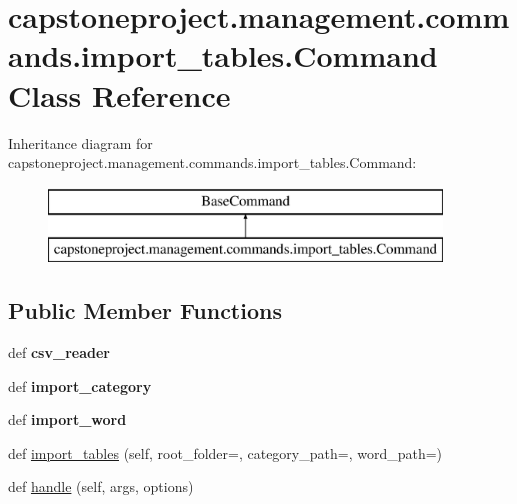 \hypertarget{classcapstoneproject_1_1management_1_1commands_1_1import__tables_1_1_command}{}\section{capstoneproject.\+management.\+commands.\+import\+\_\+tables.\+Command Class Reference}
\label{classcapstoneproject_1_1management_1_1commands_1_1import__tables_1_1_command}
Inheritance diagram for capstoneproject.\+management.\+commands.\+import\+\_\+tables.\+Command\+:\begin{figure}[H]
\begin{center}
\leavevmode
\includegraphics[height=2.000000cm]{classcapstoneproject_1_1management_1_1commands_1_1import__tables_1_1_command}
\end{center}
\end{figure}
\subsection*{Public Member Functions}
\begin{DoxyCompactItemize}
\item 
\mbox{\label{classcapstoneproject_1_1management_1_1commands_1_1import__tables_1_1_command_a4656a82a4bacd81dcd535a2ba6c652fa}} 
def {\bfseries csv\+\_\+reader}
\item 
\mbox{\label{classcapstoneproject_1_1management_1_1commands_1_1import__tables_1_1_command_a24bcc70d03aa9a37bf7f24edc70f851e}} 
def {\bfseries import\+\_\+category}
\item 
\mbox{\label{classcapstoneproject_1_1management_1_1commands_1_1import__tables_1_1_command_a4c3c255dea0b11e58d1e595cddcf0576}} 
def {\bfseries import\+\_\+word}
\item 
def \mbox{\hyperlink{classcapstoneproject_1_1management_1_1commands_1_1import__tables_1_1_command_a0dcd206805dbb47f91221c22dd2f2db0}{import\+\_\+tables}} (self, root\+\_\+folder=\textquotesingle{}\textquotesingle{}, category\+\_\+path=\textquotesingle{}\textquotesingle{}, word\+\_\+path=\textquotesingle{}\textquotesingle{})
\item 
def \mbox{\hyperlink{classcapstoneproject_1_1management_1_1commands_1_1import__tables_1_1_command_a0ab9db6ed07e47f4ff5e6a5beb51674c}{handle}} (self, args, options)
\end{DoxyCompactItemize}



